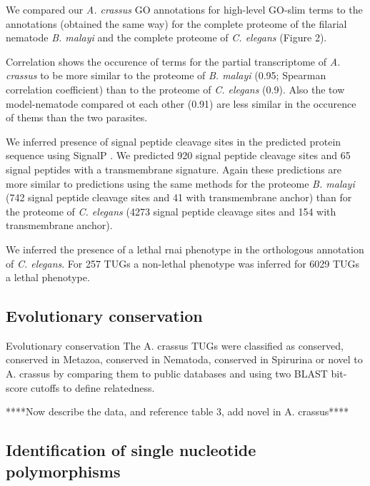 \documentclass[10pt]{bmc_article}
\newenvironment{bmcformat}{\begin{raggedright}\baselineskip20pt\sloppy\setboolean{publ}{false}}{\end{raggedright}\baselineskip20pt\sloppy}
\begin{document}
\begin{bmcformat}
We compared our \textit{A. crassus} GO annotations for high-level
GO-slim terms to the annotations (obtained the same way) for the
complete proteome of the filarial nematode \textit{B. malayi} and the
complete proteome of \textit{C. elegans} (Figure 2).

Correlation shows the occurence of terms for the partial transcriptome
of \textit{A. crassus} to be more similar to the proteome of
\textit{B. malayi} (0.95; Spearman
correlation coefficient) than to the proteome of \textit{C. elegans}
(0.9). Also the tow model-nematode compared
ot each other (0.91) are less similar in the
occurence of thems than the two parasites.

We inferred presence of signal peptide cleavage sites in the predicted
protein sequence using SignalP \cite{pmid21959131}. We predicted
920 signal peptide cleavage sites and 65 signal
peptides with a transmembrane signature. Again these predictions are
more similar to predictions using the same methods for the proteome
\textit{B. malayi} (742 signal peptide cleavage sites and
41 with transmembrane anchor) than for the proteome of
\textit{C. elegans} (4273 signal peptide cleavage sites
and 154 with transmembrane anchor).

We inferred the presence of a lethal rnai phenotype in the orthologous
annotation of \textit{C. elegans}. For 257
TUGs a non-lethal phenotype was inferred for
6029 TUGs a lethal phenotype.

\subsection*{Evolutionary conservation}

Evolutionary conservation The A. crassus TUGs were classified as
conserved, conserved in Metazoa, conserved in Nematoda, conserved in
Spirurina or novel to A. crassus by comparing them to public databases
and using two BLAST bit-score cutoffs to define relatedness.


****Now describe the data, and reference table 3, add novel in
A. crassus****
 
\subsection*{Identification of single nucleotide polymorphisms}


\end{bmcformat}
\end{document}
